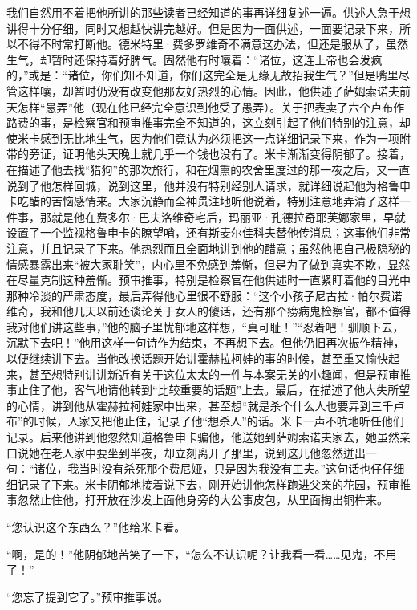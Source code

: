 \par 我们自然用不着把他所讲的那些读者已经知道的事再详细复述一遍。供述人急于想讲得十分仔细，同时又想越快讲完越好。但是因为一面供述，一面要记录下来，所以不得不时常打断他。德米特里·费多罗维奇不满意这办法，但还是服从了，虽然生气，却暂时还保持着好脾气。固然他有时嚷着：“诸位，这连上帝也会发疯的，”或是：“诸位，你们知不知道，你们这完全是无缘无故招我生气？”但是嘴里尽管这样嚷，却暂时仍没有改变他那友好热烈的心情。因此，他供述了萨姆索诺夫前天怎样“愚弄”他（现在他已经完全意识到他受了愚弄）。关于把表卖了六个卢布作路费的事，是检察官和预审推事完全不知道的，这立刻引起了他们特别的注意，却使米卡感到无比地生气，因为他们竟认为必须把这一点详细记录下来，作为一项附带的旁证，证明他头天晚上就几乎一个钱也没有了。米卡渐渐变得阴郁了。接着，在描述了他去找“猎狗”的那次旅行，和在烟熏的农舍里度过的那一夜之后，又一直说到了他怎样回城，说到这里，他并没有特别经别人请求，就详细说起他为格鲁申卡吃醋的苦恼感情来。大家沉静而全神贯注地听他说着，特别注意地弄清了这样一件事，那就是他在费多尔·巴夫洛维奇宅后，玛丽亚·孔德拉奇耶芙娜家里，早就设置了一个监视格鲁申卡的瞭望哨，还有斯麦尔佳科夫替他传消息；这事他们非常注意，并且记录了下来。他热烈而且全面地讲到他的醋意；虽然他把自己极隐秘的情感暴露出来“被大家耻笑”，内心里不免感到羞惭，但是为了做到真实不欺，显然在尽量克制这种羞惭。预审推事，特别是检察官在他供述时一直紧盯着他的目光中那种冷淡的严肃态度，最后弄得他心里很不舒服：“这个小孩子尼古拉·帕尔费诺维奇，我和他几天以前还谈论关于女人的傻话，还有那个痨病鬼检察官，都不值得我对他们讲这些事，”他的脑子里忧郁地这样想，“真可耻！”“忍着吧！驯顺下去，沉默下去吧！”他用这样一句诗作为结束，不再想下去。但他仍旧再次振作精神，以便继续讲下去。当他改换话题开始讲霍赫拉柯娃的事的时候，甚至重又愉快起来，甚至想特别讲讲新近有关于这位太太的一件与本案无关的小趣闻，但是预审推事止住了他，客气地请他转到“比较重要的话题”上去。最后，在描述了他大失所望的心情，讲到他从霍赫拉柯娃家中出来，甚至想“就是杀个什么人也要弄到三千卢布”的时候，人家又把他止住，记录了他“想杀人”的话。米卡一声不吭地听任他们记录。后来他讲到他忽然知道格鲁申卡骗他，他送她到萨姆索诺夫家去，她虽然亲口说她在老人家中要坐到半夜，却立刻离开了那里，说到这儿他忽然迸出一句：“诸位，我当时没有杀死那个费尼娅，只是因为我没有工夫。”这句话也仔仔细细记录了下来。米卡阴郁地接着说下去，刚开始讲他怎样跑进父亲的花园，预审推事忽然止住他，打开放在沙发上面他身旁的大公事皮包，从里面掏出铜杵来。
\par “您认识这个东西么？”他给米卡看。
\par “啊，是的！”他阴郁地苦笑了一下，“怎么不认识呢？让我看一看……见鬼，不用了！”
\par “您忘了提到它了。”预审推事说。
